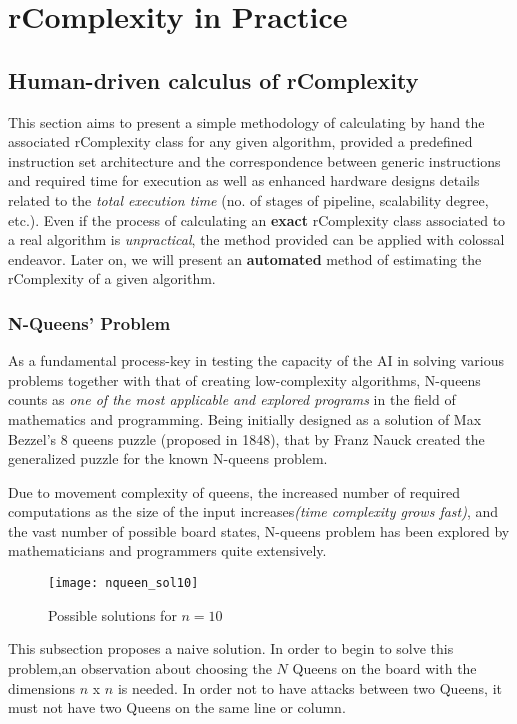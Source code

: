 \chapter{rComplexity in Practice}


\section{Human-driven calculus of rComplexity}
This section aims to present a simple methodology of calculating by hand the associated rComplexity class for any given algorithm, provided a predefined instruction set architecture and the correspondence between generic instructions and required time for execution as well as enhanced hardware designs details related to the \textit{total execution time} (no. of stages of pipeline, scalability degree, etc.)\cite{hennessy2011computer}. Even if the process of calculating an \textbf{exact} rComplexity class associated to a real algorithm is \textit{unpractical}, the method provided can be applied with colossal endeavor. Later on, we will present an \textbf{automated} method of estimating the rComplexity of a given algorithm.

\subsection{N-Queens’ Problem}


As a fundamental process-key in testing the capacity of the AI in solving various problems together with that of creating low-complexity algorithms, N-queens counts as \textit{one of the most applicable and explored programs} in the field of mathematics and programming. Being initially designed as a solution of Max Bezzel’s 8 queens puzzle (proposed in 1848), that by Franz Nauck created the generalized puzzle for the known N-queens problem.

Due to movement complexity of queens, the increased number of required computations as the size of the input increases\textit{(time complexity grows fast)}, and the vast number of possible board states, N-queens problem has been explored by mathematicians and programmers quite extensively.

\begin{figure}[H]
    \centering
    \texttt{[image: nqueen\_sol10]}
    \caption{Possible solutions for $n=10$}
\end{figure}

This subsection proposes a naive solution. In order to begin to solve this problem,an observation about choosing the $N$ Queens on the board with the dimensions $n$ x $n$ is needed. In order not to have attacks between two Queens, it must not have two Queens on the same line or column.


